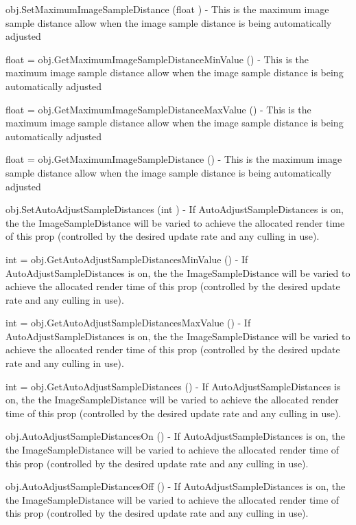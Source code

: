 \begin{DoxyItemize}
\item {\ttfamily obj.\-Set\-Maximum\-Image\-Sample\-Distance (float )} -\/ This is the maximum image sample distance allow when the image sample distance is being automatically adjusted  
\item {\ttfamily float = obj.\-Get\-Maximum\-Image\-Sample\-Distance\-Min\-Value ()} -\/ This is the maximum image sample distance allow when the image sample distance is being automatically adjusted  
\item {\ttfamily float = obj.\-Get\-Maximum\-Image\-Sample\-Distance\-Max\-Value ()} -\/ This is the maximum image sample distance allow when the image sample distance is being automatically adjusted  
\item {\ttfamily float = obj.\-Get\-Maximum\-Image\-Sample\-Distance ()} -\/ This is the maximum image sample distance allow when the image sample distance is being automatically adjusted  
\item {\ttfamily obj.\-Set\-Auto\-Adjust\-Sample\-Distances (int )} -\/ If Auto\-Adjust\-Sample\-Distances is on, the the Image\-Sample\-Distance will be varied to achieve the allocated render time of this prop (controlled by the desired update rate and any culling in use).  
\item {\ttfamily int = obj.\-Get\-Auto\-Adjust\-Sample\-Distances\-Min\-Value ()} -\/ If Auto\-Adjust\-Sample\-Distances is on, the the Image\-Sample\-Distance will be varied to achieve the allocated render time of this prop (controlled by the desired update rate and any culling in use).  
\item {\ttfamily int = obj.\-Get\-Auto\-Adjust\-Sample\-Distances\-Max\-Value ()} -\/ If Auto\-Adjust\-Sample\-Distances is on, the the Image\-Sample\-Distance will be varied to achieve the allocated render time of this prop (controlled by the desired update rate and any culling in use).  
\item {\ttfamily int = obj.\-Get\-Auto\-Adjust\-Sample\-Distances ()} -\/ If Auto\-Adjust\-Sample\-Distances is on, the the Image\-Sample\-Distance will be varied to achieve the allocated render time of this prop (controlled by the desired update rate and any culling in use).  
\item {\ttfamily obj.\-Auto\-Adjust\-Sample\-Distances\-On ()} -\/ If Auto\-Adjust\-Sample\-Distances is on, the the Image\-Sample\-Distance will be varied to achieve the allocated render time of this prop (controlled by the desired update rate and any culling in use).  
\item {\ttfamily obj.\-Auto\-Adjust\-Sample\-Distances\-Off ()} -\/ If Auto\-Adjust\-Sample\-Distances is on, the the Image\-Sample\-Distance will be varied to achieve the allocated render time of this prop (controlled by the desired update rate and any culling in use).  

\end{DoxyItemize}
